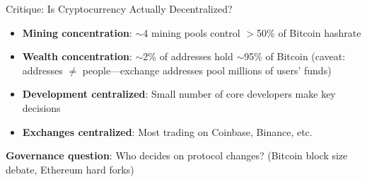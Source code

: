 ﻿\documentclass[aspectratio=169,11pt]{beamer}
\begin{document}
\begin{frame}[shrink=8]{Critique: Is Cryptocurrency Actually Decentralized?}
\begin{objectionbox}
\small
\begin{itemize}
    \item \textbf{Mining concentration}: $\sim$4 mining pools control $>$50\% of Bitcoin hashrate
    \item \textbf{Wealth concentration}: $\sim$2\% of addresses hold $\sim$95\% of Bitcoin (caveat: addresses $\neq$ people---exchange addresses pool millions of users' funds)
    \item \textbf{Development centralized}: Small number of core developers make key decisions
    \item \textbf{Exchanges centralized}: Most trading on Coinbase, Binance, etc.
\end{itemize}
\end{objectionbox}

\vspace{0.2em}
\begin{center}
\end{center}
\vspace{-0.3em}
\textbf{Governance question}: Who decides on protocol changes? (Bitcoin block size debate, Ethereum hard forks)
\end{frame}
\end{document}
